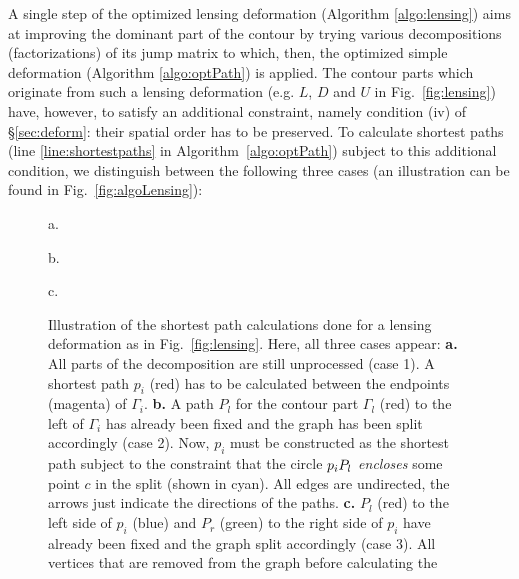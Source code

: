 \documentclass[reqno]{amsart}
\let\join\relax
\DeclareMathOperator{\join}{\dot{+}}
\begin{document}
A single step of the optimized lensing deformation (Algorithm \ref{algo:lensing}) aims at improving the
dominant part of the contour by trying various decompositions (factorizations) of its jump matrix to which, then, the optimized simple deformation (Algorithm \ref{algo:optPath}) 
is applied. The contour parts which originate from such a lensing deformation (e.g. $L$, $D$ and $U$ in Fig.~\ref{fig:lensing}) have, however, to satisfy an additional constraint, namely condition (iv) of §\ref{sec:deform}: their spatial
order has to be preserved. To calculate shortest paths (line \ref{line:shortestpaths} in Algorithm~\ref{algo:optPath}) subject to this additional condition, we distinguish between the following three cases (an illustration can be found in Fig.~\ref{fig:algoLensing}): 

\begin{figure}[h]
	\begin{minipage}{0.30\textwidth}
		\begin{center}
			
			a.
		\end{center}
	\end{minipage}
	\hfil
	\begin{minipage}{0.30\textwidth}
		\begin{center}
			
			b.
		\end{center}
	\end{minipage}
	\hfil
	\begin{minipage}{0.30\textwidth}
		\begin{center}
			
			c.
		\end{center}
	\end{minipage}
	\caption{Illustration of the shortest path calculations done for a lensing deformation as in Fig.~\ref{fig:lensing}.
	Here, all three cases appear: 
	\textbf{a.} All parts of the decomposition are still unprocessed (case 1). A shortest path $p_i$ (red) has to be calculated between the endpoints (magenta) of $\Gamma_i$.
	\textbf{b.} A path $P_l$ for the contour part $\Gamma_l$ (red) to the left of $\Gamma_i$ has already been fixed and the graph has been split accordingly (case 2). Now, $p_i$ must be constructed as the shortest path subject to the constraint that the circle $p_i \join P_l$ {\em encloses} some point $c$ in the split (shown in cyan). All edges are undirected, the arrows just indicate the directions of the paths. 
	\textbf{c.}  $P_l$ (red) to the left side of $p_i$ (blue) and $P_r$ (green) to the right side of $p_i$ have already been fixed and the graph split accordingly (case 3). All vertices that are removed from the graph before calculating the
}
\end{figure}
\end{document}
